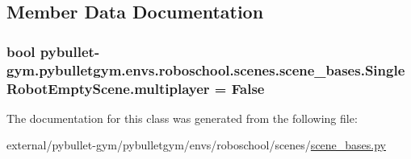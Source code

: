 \subsection{Member Data Documentation}
\subsubsection[{\texorpdfstring{multiplayer}{multiplayer}}]{\setlength{\rightskip}{0pt plus 5cm}bool pybullet-\/gym.\+pybulletgym.\+envs.\+roboschool.\+scenes.\+scene\+\_\+bases.\+Single\+Robot\+Empty\+Scene.\+multiplayer = False\hspace{0.3cm}{\ttfamily [static]}}\hypertarget{classpybullet-gym_1_1pybulletgym_1_1envs_1_1roboschool_1_1scenes_1_1scene__bases_1_1_single_robot_empty_scene_a315ceb8e6a21f14f252249e80b74ef7d}{}\label{classpybullet-gym_1_1pybulletgym_1_1envs_1_1roboschool_1_1scenes_1_1scene__bases_1_1_single_robot_empty_scene_a315ceb8e6a21f14f252249e80b74ef7d}


The documentation for this class was generated from the following file\+:\begin{DoxyCompactItemize}
\item 
external/pybullet-\/gym/pybulletgym/envs/roboschool/scenes/\hyperlink{roboschool_2scenes_2scene__bases_8py}{scene\+\_\+bases.\+py}\end{DoxyCompactItemize}

